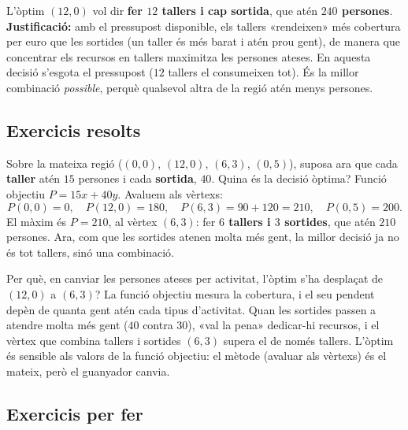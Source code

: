 \begin{exemple}
L'òptim $(12,0)$ vol dir \textbf{fer $12$ tallers i cap sortida}, que atén
\textbf{$240$ persones}. \textbf{Justificació:} amb el pressupost disponible, els
tallers «rendeixen» més cobertura per euro que les sortides (un taller és més barat i
atén prou gent), de manera que concentrar els recursos en tallers maximitza les
persones ateses. En aquesta decisió s'esgota el pressupost ($12$ tallers el consumeixen
tot). És la millor combinació \emph{possible}, perquè qualsevol altra de la regió atén
menys persones.
\end{exemple}

\subsection{Exercicis resolts}

\begin{exresolt}
Sobre la mateixa regió ($(0,0)$, $(12,0)$, $(6,3)$, $(0,5)$), suposa ara que cada
\textbf{taller} atén $15$ persones i cada \textbf{sortida}, $40$. Quina és la decisió
òptima?
\solucio
Funció objectiu $P=15x+40y$. Avaluem als vèrtexs:
\[
P(0,0)=0,\quad P(12,0)=180,\quad P(6,3)=90+120=210,\quad P(0,5)=200.
\]
El màxim és $P=210$, al vèrtex $(6,3)$: fer \textbf{$6$ tallers i $3$ sortides}, que
atén $210$ persones. Ara, com que les sortides atenen molta més gent, la millor
decisió ja no és tot tallers, sinó una combinació.
\end{exresolt}

\begin{exresolt}
Per què, en canviar les persones ateses per activitat, l'òptim s'ha desplaçat de
$(12,0)$ a $(6,3)$?
\solucio
La funció objectiu mesura la cobertura, i el seu pendent depèn de quanta gent atén
cada tipus d'activitat. Quan les sortides passen a atendre molta més gent ($40$ contra
$30$), «val la pena» dedicar-hi recursos, i el vèrtex que combina tallers i sortides
$(6,3)$ supera el de només tallers. L'òptim és sensible als valors de la funció
objectiu: el mètode (avaluar als vèrtexs) és el mateix, però el guanyador canvia.
\end{exresolt}

\subsection{Exercicis per fer}

